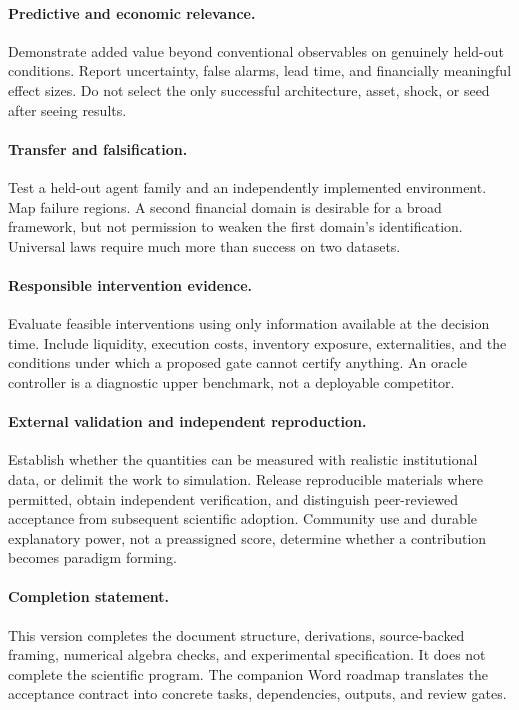 \documentclass[11pt,a4paper]{article}
\theoremstyle{definition}
\theoremstyle{remark}
\begin{document}
\paragraph{Predictive and economic relevance.}
Demonstrate added value beyond conventional observables on genuinely held-out conditions. Report uncertainty, false alarms, lead time, and financially meaningful effect sizes. Do not select the only successful architecture, asset, shock, or seed after seeing results.

\paragraph{Transfer and falsification.}
Test a held-out agent family and an independently implemented environment. Map failure regions. A second financial domain is desirable for a broad framework, but not permission to weaken the first domain's identification. Universal laws require much more than success on two datasets.

\paragraph{Responsible intervention evidence.}
Evaluate feasible interventions using only information available at the decision time. Include liquidity, execution costs, inventory exposure, externalities, and the conditions under which a proposed gate cannot certify anything. An oracle controller is a diagnostic upper benchmark, not a deployable competitor.

\paragraph{External validation and independent reproduction.}
Establish whether the quantities can be measured with realistic institutional data, or delimit the work to simulation. Release reproducible materials where permitted, obtain independent verification, and distinguish peer-reviewed acceptance from subsequent scientific adoption. Community use and durable explanatory power, not a preassigned score, determine whether a contribution becomes paradigm forming.

\paragraph{Completion statement.}
This version completes the document structure, derivations, source-backed framing, numerical algebra checks, and experimental specification. It does not complete the scientific program. The companion Word roadmap translates the acceptance contract into concrete tasks, dependencies, outputs, and review gates.
\end{document}
